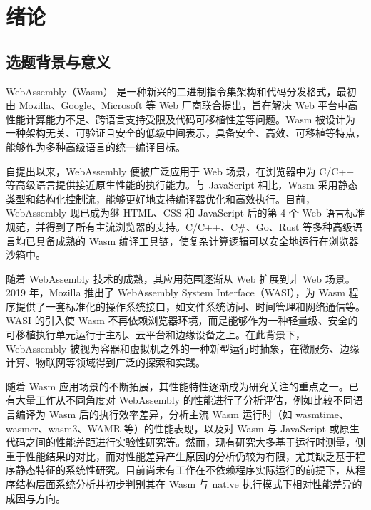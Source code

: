 \chapter{绪论}

\label{cha:introduction}
\section{选题背景与意义}
\label{sec:background}

WebAssembly（Wasm） 是一种新兴的二进制指令集架构和代码分发格式，最初由 Mozilla、Google、Microsoft 等 Web 厂商联合提出，旨在解决 Web 平台中高性能计算能力不足、跨语言支持受限及代码可移植性差等问题\cite{haas2017bringing}。Wasm 被设计为一种架构无关、可验证且安全的低级中间表示，具备安全、高效、可移植等特点，能够作为多种高级语言的统一编译目标。

自提出以来，WebAssembly 便被广泛应用于 Web 场景，在浏览器中为 C/C++ 等高级语言提供接近原生性能的执行能力。与 JavaScript 相比，Wasm 采用静态类型和结构化控制流，能够更好地支持编译器优化和高效执行。目前，WebAssembly 现已成为继 HTML、CSS 和 JavaScript 后的第 4 个 Web 语言标准规范，并得到了所有主流浏览器的支持。C/C++、C\#、Go、Rust 等多种高级语言均已具备成熟的 Wasm 编译工具链，使复杂计算逻辑可以安全地运行在浏览器沙箱中\cite{mdn:wasm-c-guide,mdn_rust_wasm,gopherjs,zakai2011emscripten}。

随着 WebAssembly 技术的成熟，其应用范围逐渐从 Web 扩展到非 Web 场景。2019 年，Mozilla 推出了 WebAssembly System Interface（WASI），为 Wasm 程序提供了一套标准化的操作系统接口，如文件系统访问、时间管理和网络通信等\cite{wasi_standardizing}。WASI 的引入使 Wasm 不再依赖浏览器环境，而是能够作为一种轻量级、安全的可移植执行单元运行于主机、云平台和边缘设备之上。在此背景下，WebAssembly 被视为容器和虚拟机之外的一种新型运行时抽象，在微服务、边缘计算、物联网等领域得到广泛的探索和实践\cite{liu2021aerogel,sok2024webassembly}。

随着 Wasm 应用场景的不断拓展，其性能特性逐渐成为研究关注的重点之一。已有大量工作从不同角度对 WebAssembly 的性能进行了分析评估，例如比较不同语言编译为 Wasm 后的执行效率差异\cite{prabakar2024webassembly}，分析主流 Wasm 运行时（如 wasmtime、wasmer、wasm3、WAMR 等）的性能表现\cite{zhang2025research,dierickxcomparative}，以及对 Wasm 与 JavaScript 或原生代码之间的性能差距进行实验性研究等\cite{jangda2021not,sunarto2023systematic,yan2021understanding}。然而，现有研究大多基于运行时测量，侧重于性能结果的对比，而对性能差异产生原因的分析仍较为有限，尤其缺乏基于程序静态特征的系统性研究。目前尚未有工作在不依赖程序实际运行的前提下，从程序结构层面系统分析并初步判别其在 Wasm 与 native 执行模式下相对性能差异的成因与方向。

